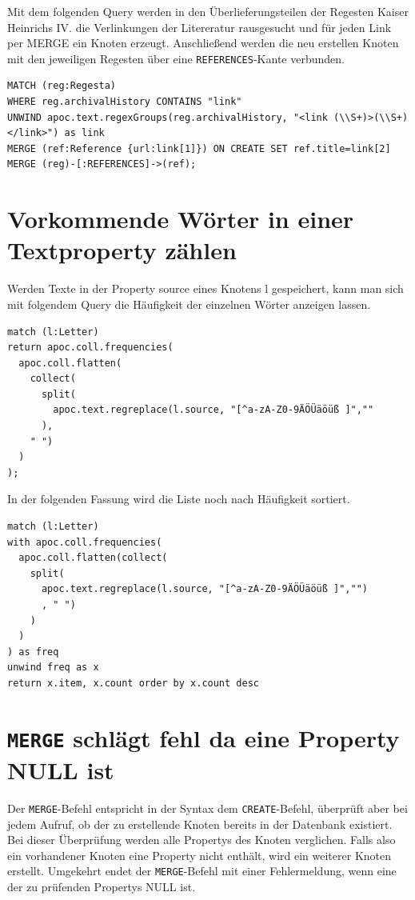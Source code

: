 \documentclass[ngerman,]{scrreprt}
\begin{document}
Mit dem folgenden Query werden in den Überlieferungsteilen der Regesten Kaiser Heinrichs IV. die Verlinkungen der Litereratur rausgesucht und für jeden Link per MERGE ein Knoten erzeugt. Anschließend werden die neu erstellen Knoten mit den jeweiligen Regesten über eine \texttt{REFERENCES}-Kante verbunden.

\begin{verbatim}
MATCH (reg:Regesta)
WHERE reg.archivalHistory CONTAINS "link"
UNWIND apoc.text.regexGroups(reg.archivalHistory, "<link (\\S+)>(\\S+)</link>") as link
MERGE (ref:Reference {url:link[1]}) ON CREATE SET ref.title=link[2]
MERGE (reg)-[:REFERENCES]->(ref);
\end{verbatim}

\section{Vorkommende Wörter in einer Textproperty zählen}\label{vorkommende-wuxf6rter-in-einer-textproperty-zuxe4hlen}

Werden Texte in der Property source eines Knotens l gespeichert, kann man sich mit folgendem Query die Häufigkeit der einzelnen Wörter anzeigen lassen.

\begin{verbatim}
match (l:Letter)
return apoc.coll.frequencies(
  apoc.coll.flatten(
    collect(
      split(
        apoc.text.regreplace(l.source, "[^a-zA-Z0-9ÄÖÜäöüß ]",""
      ),
    " ")
  )
);
\end{verbatim}

In der folgenden Fassung wird die Liste noch nach Häufigkeit sortiert.

\begin{verbatim}
match (l:Letter)
with apoc.coll.frequencies(
  apoc.coll.flatten(collect(
    split(
      apoc.text.regreplace(l.source, "[^a-zA-Z0-9ÄÖÜäöüß ]","")
      , " ")
    )
  )
) as freq
unwind freq as x
return x.item, x.count order by x.count desc
\end{verbatim}

\section{\texorpdfstring{\texttt{MERGE} schlägt fehl da eine Property NULL ist}{MERGE schlägt fehl da eine Property NULL ist}}\label{merge-schluxe4gt-fehl-da-eine-property-null-ist}

Der \texttt{MERGE}-Befehl entspricht in der Syntax dem \texttt{CREATE}-Befehl, überprüft aber bei jedem Aufruf, ob der zu erstellende Knoten bereits in der Datenbank existiert. Bei dieser Überprüfung werden alle Propertys des Knoten verglichen. Falls also ein vorhandener Knoten eine Property nicht enthält, wird ein weiterer Knoten erstellt. Umgekehrt endet der \texttt{MERGE}-Befehl mit einer Fehlermeldung, wenn eine der zu prüfenden Propertys NULL ist.
\end{document}
